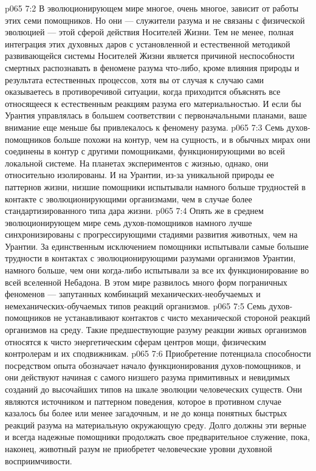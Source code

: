 \vs p065 7:2 В эволюционирующем мире многое, очень многое, зависит от работы этих семи помощников. Но они --- служители разума и не связаны с физической эволюцией --- этой сферой действия Носителей Жизни. Тем не менее, полная интеграция этих духовных даров с установленной и естественной методикой развивающейся системы Носителей Жизни является причиной неспособности смертных распознавать в феномене разума что\hyp{}либо, кроме влияния природы и результата естественных процессов, хотя вы от случая к случаю сами оказываетесь в противоречивой ситуации, когда приходится объяснять все относящееся к естественным реакциям разума его материальностью. И если бы Урантия управлялась в большем соответствии с первоначальными планами, ваше внимание еще меньше бы привлекалось к феномену разума.
\vs p065 7:3 Семь духов\hyp{}помощников больше похожи на контур, чем на сущность, и в обычных мирах они соединены в контур с другими помощниками, функционирующими во всей локальной системе. На планетах экспериментов с жизнью, однако, они относительно изолированы. И на Урантии, из\hyp{}за уникальной природы ее паттернов жизни, низшие помощники испытывали намного больше трудностей в контакте с эволюционирующими организмами, чем в случае более стандартизированного типа дара жизни.
\vs p065 7:4 Опять же в среднем эволюционирующем мире семь духов\hyp{}помощников намного лучше синхронизированы с прогрессирующими стадиями развития животных, чем на Урантии. За единственным исключением помощники испытывали самые большие трудности в контактах с эволюционирующими разумами организмов Урантии, намного больше, чем они когда\hyp{}либо испытывали за все их функционирование во всей вселенной Небадона. В этом мире развилось много форм пограничных феноменов --- запутанных комбинаций механических\hyp{}необучаемых и немеханических\hyp{}обучаемых типов реакций организмов.
\vs p065 7:5 Семь духов\hyp{}помощников не устанавливают контактов с чисто механической стороной реакций организмов на среду. Такие предшествующие разуму реакции живых организмов относятся к чисто энергетическим сферам центров мощи, физическим контролерам и их сподвижникам.
\vs p065 7:6 Приобретение потенциала способности  посредством опыта обозначает начало функционирования духов\hyp{}помощников, и они действуют начиная с самого низшего разума примитивных и невидимых созданий до высочайших типов на шкале эволюции человеческих существ. Они являются источником и паттерном поведения, которое в противном случае казалось бы более или менее загадочным, и не до конца понятных быстрых реакций разума на материальную окружающую среду. Долго должны эти верные и всегда надежные помощники продолжать свое предварительное служение, пока, наконец, животный разум не приобретет человеческие уровни духовной восприимчивости.
